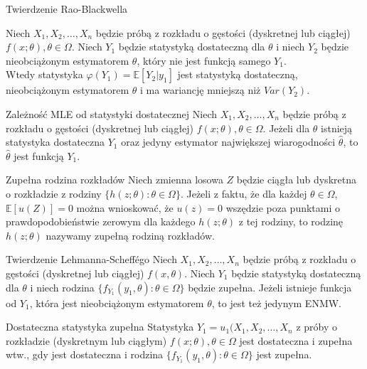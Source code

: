 \documentclass[avery5371, grid, frame]{flashcards}
\begin{document}
\begin{flashcard}[Twierdzenie]{Twierdzenie Rao-Blackwella}
    \begin{small}
    Niech $X_1, X_2, \dots, X_n$ będzie próbą z rozkładu o gęstości (dyskretnej lub ciągłej) $f(x; \theta), \theta \in \Omega$. Niech $Y_1$ będzie statystyką dostateczną dla $\theta$ i niech $Y_2$ będzie nieobciążonym estymatorem $\theta$, który nie jest funkcją samego $Y_1$.\\
    Wtedy statystyka $\varphi(Y_1) = \mathbb{E}[Y_2 | y_1]$ jest statystyką dostateczną, nieobciążonym estymatorem $\theta$ i ma wariancję mniejszą niż $Var(Y_2)$.
    \end{small}
\end{flashcard}

\begin{flashcard}[Twierdzenie]{Zależność MLE od statystyki dostatecznej}
    Niech $X_1, X_2, \dots, X_n$ będzie próbą z rozkładu o gęstości (dyskretnej lub ciągłej) $f(x; \theta), \theta \in \Omega$. Jeżeli dla $\theta$ istnieją statystyka dostateczna $Y_1$ oraz jedyny estymator największej wiarogodności $\hat{\theta}$, to $\hat{\theta}$ jest funkcją $Y_1$.
\end{flashcard}

\begin{flashcard}[Definicja]{Zupełna rodzina rozkładów}
    Niech zmienna losowa $Z$ będzie ciągła lub dyskretna o rozkładzie z rodziny $\{h(z; \theta) : \theta \in \Omega\}$. Jeżeli z faktu, że dla każdej $\theta \in \Omega $, $\mathbb{E}[u(Z)] = 0$ można wnioskować, że $u(z) = 0$ wszędzie poza punktami o prawdopodobieństwie zerowym dla każdego $h(z; \theta)$ z tej rodziny, to rodzinę $h(z; \theta)$ nazywamy zupełną rodziną rozkładów.
\end{flashcard}

\begin{flashcard}[Twierdzenie]{Twierdzenie Lehmanna-Scheff\'ego}
    Niech $X_1, X_2, \dots, X_n$ będzie próbą z rozkładu o gęstości (dyskretnej lub ciągłej) $f(x, \theta)$. Niech $Y_1$ będzie statystyką dostateczną dla $\theta$ i niech rodzina $\{ f_{Y_1}(y_1, \theta) : \theta \in \Omega \}$ będzie zupełna. Jeżeli istnieje funkcja od $Y_1$, która jest nieobciążonym estymatorem $\theta$, to jest też jedynym ENMW.
\end{flashcard}

\begin{flashcard}[Definicja]{Dostateczna statystyka zupełna}
    Statystyka $Y_1 = u_1(X_1, X_2, \dots, X_n$ z próby o rozkładzie (dyskretnym lub ciągłym) $f(x; \theta), \theta \in \Omega$ jest dostateczna i zupełna wtw., gdy jest dostateczna i rodzina $\{ f_{Y_1}(y_1, \theta) : \theta \in \Omega \}$ jest zupełna.
\end{flashcard}
\end{document}
